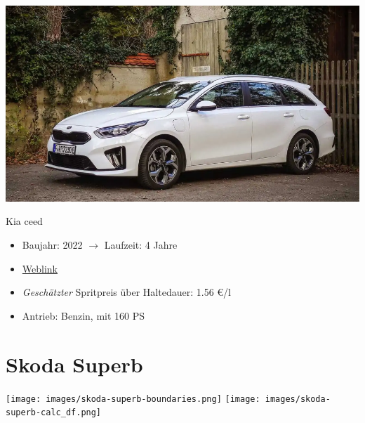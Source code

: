 \documentclass[landscape, DIV=99, 14pt]{scrartcl}
\begin{document}
\pagebreak
\null
\vspace{2cm}
\begin{center}
\includegraphics[width=0.9\columnwidth]{cars/kia-ceed-sportswagon.png}

Kia ceed
\end{center}

\begin{itemize}
    \item Baujahr: 2022 $\rightarrow$ Laufzeit: 4 Jahre
    \item \href{https://konfigurator.meinauto.de/kia/neuwagen/cee-d/angebote/cee-d-sporty-wagon/konfigurator/\#!/preisvergleich/platinum/8867329/3,7,18/private/109347-4167-291321/1321/61d21ce73c5db/cash-purchase/109348-8088-291322/48,0,10000,0,0,0,0,0,}{Weblink}
    \item \emph{Gesch\"atzter} Spritpreis \"uber Haltedauer: 1.56 \euro{}/l
    \item Antrieb: Benzin, mit 160 PS
\end{itemize}

\pagebreak


\twocolumn

\section*{Skoda Superb}
\begin{center}
\texttt{[image: images/skoda-superb-boundaries.png]}
\null
\vspace{0.5cm}
\texttt{[image: images/skoda-superb-calc\_df.png]}
\end{center}
\end{document}
